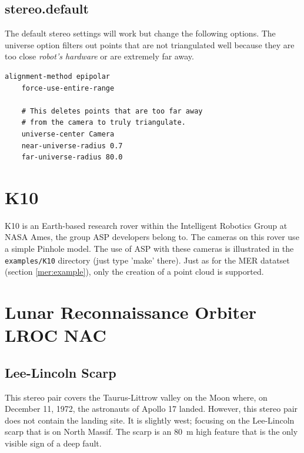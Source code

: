 \subsection*{stereo.default}

The default stereo settings will work but change the following
options. The universe option filters out points that are not
triangulated well because they are too close \emph{robot's hardware}
or are extremely far away.

\begin{center}\begin{minipage}{5.5in}
\begin{Verbatim}[frame=single,fontsize=\small,label=additional settings for MER]
    alignment-method epipolar
    force-use-entire-range

    # This deletes points that are too far away
    # from the camera to truly triangulate.
    universe-center Camera
    near-universe-radius 0.7
    far-universe-radius 80.0
\end{Verbatim}
\end{minipage}\end{center}

\clearpage
\section{K10}\label{k10:example}

K10 is an Earth-based research rover within the Intelligent
Robotics Group at NASA Ames, the group ASP developers belong to. The
cameras on this rover use a simple Pinhole model. The use of ASP with
these cameras is illustrated in the \texttt{examples/K10} directory
(just type 'make' there).  Just as for the MER datatset (section
\ref{mer:example}), only the creation of a point cloud is supported.

\clearpage
\section{Lunar Reconnaissance Orbiter LROC NAC}
\label{lronac-example}

\subsection{Lee-Lincoln Scarp}

This stereo pair covers the Taurus-Littrow valley on the Moon where,
on December 11, 1972, the astronauts of Apollo 17 landed. However,
this stereo pair does not contain the landing site.  It is slightly
west; focusing on the Lee-Lincoln scarp that is on North Massif. The
scarp is an 80~m high feature that is the only visible sign of a deep
fault.

